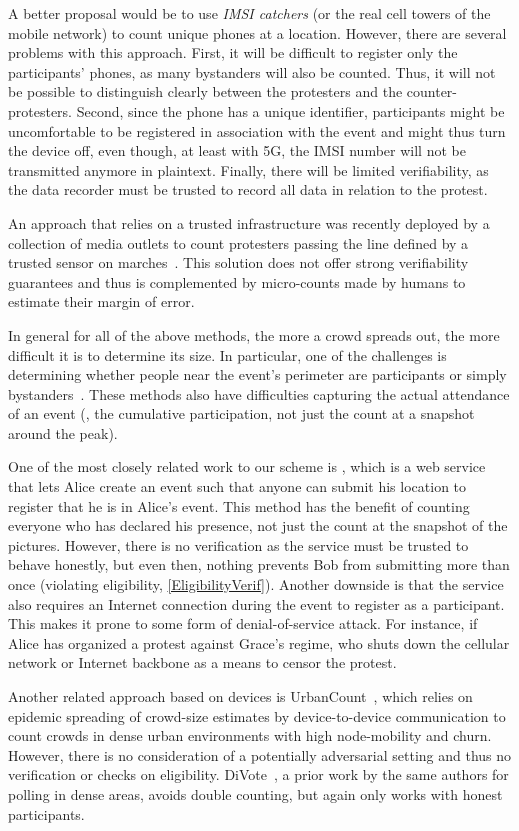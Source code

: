 A better proposal would be to use \emph{IMSI catchers} (or the real cell towers of the mobile network) to count unique phones at a location.
However, there are several problems with this approach.
First, it will be difficult to register only the participants' phones, as many bystanders will also be counted.
Thus, it will not be possible to distinguish clearly between the protesters and the counter-protesters.
Second, since the phone has a unique identifier, participants might be uncomfortable to be registered in association with the event and might thus turn the device off, even though, at least with 5G, the IMSI number will not be transmitted anymore in plaintext. %
Finally, there will be limited verifiability, as the data recorder must be trusted to record all data in relation to the protest.

An approach that relies on a trusted infrastructure was recently deployed by a collection of media outlets to count protesters passing the line defined by a trusted sensor on marches~\cite{LeMondeProtestingSolution}. 
This solution does not offer strong verifiability guarantees and thus is complemented by micro-counts made by humans to estimate their margin of error.

In general for all of the above methods, the more a crowd spreads out, the more difficult it is to determine its size.
In particular, one of the challenges is determining whether people near the event's perimeter are participants or simply bystanders~\cite{HowToEstimateCrowdSize}.
These methods also have difficulties capturing the actual attendance of an event (\ie, the cumulative participation, not just the count at a snapshot around the peak).

One of the most closely related work to our scheme is \citet{CrowdCount}, which is a web service that lets Alice create an event such that anyone can submit his location to register that he is in Alice's event.
This method has the benefit of counting everyone who has declared his presence, not just the count at the snapshot of the pictures.
However, there is no verification as the service must be trusted to behave honestly, but even then, nothing prevents Bob from submitting more than once (violating eligibility, \cref{EligibilityVerif}).
Another downside is that the service also requires an Internet connection during the event to register as a participant.
This makes it prone to some form of denial-of-service attack.
For instance, if Alice has organized a protest against Grace's regime, who shuts down the cellular network or Internet backbone as a means to censor the protest.

Another related approach based on devices is UrbanCount~\cite{UrbanCount}, which relies on epidemic spreading of crowd-size estimates by device-to-device communication to count crowds in dense urban environments with high node-mobility and churn.
However, there is no consideration of a potentially adversarial setting and thus no verification or checks on eligibility.  DiVote~\cite{DiVote}, a prior work by the same authors for polling in dense areas, avoids double counting, but again only works with honest participants.

